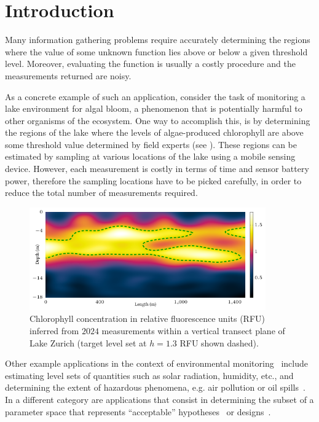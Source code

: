 \chapter{Introduction}
Many information gathering problems 
require accurately determining the regions where the value of some
unknown function lies above or below a given threshold level.
Moreover, evaluating the function is usually a costly
procedure and the measurements returned are noisy.

As a concrete example of such an application, consider the task of
monitoring a lake environment for algal bloom, a phenomenon that is
potentially harmful to other organisms of the ecosystem. One way to
accomplish this, is by
determining the regions of the lake where the levels of algae-produced
chlorophyll are above some threshold value determined by field experts
(see ).
These regions can be estimated by sampling
at various locations of the lake using a mobile sensing device.
However, each measurement is costly in terms of time and sensor battery power,
therefore the sampling locations have to be picked carefully, in order to
reduce the total number of measurements required.

%

\begin{figure}[tb]
  \centering
  \includegraphics[width=4in,clip,trim=7pt 7pt 7pt 7pt]{figures/limno_chl_fp}
  \caption{Chlorophyll concentration in relative fluorescence units (RFU)
           inferred from $2024$ measurements within a vertical transect plane
           of Lake Zurich (target level set at $h = 1.3$ RFU shown dashed).}
  \label{fig:limno_chl}
\end{figure}

Other example applications in the context of environmental
monitoring~\cite{rahimi04} include estimating level sets of quantities
such as solar radiation, humidity, etc., and determining
the extent of hazardous phenomena, e.g. air pollution or
oil spills~\cite{galland04}.
In a different category are applications that consist in determining
the subset of a
parameter space that represents ``acceptable'' hypotheses~\cite{bryan05} or
designs~\cite{ramakrishnan05}.

